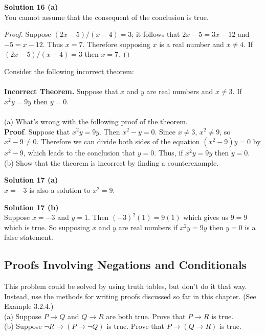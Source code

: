 \textbf{Solution 16 (a)} \\
You cannot assume that the consequent of the conclusion is true.

\begin{proof}
    Suppose $(2x - 5)/(x - 4) = 3$; it follows that $2x - 5 = 3x - 12$ and $-5 = x - 12$. Thus $x = 7$.
    Therefore supposing $x$ is a real number and $x \not = 4$. If 
    $(2x - 5)/(x - 4) = 3$ then $x = 7$.
\end{proof}

\begin{tcolorbox}[title=Problem 17, breakable]
    Consider the following incorrect theorem: \\ \\
    \textbf{Incorrect Theorem.} Suppose that $x$ and $y$ are real numbers 
    and $x \not = 3$. If $x^2y = 9y$ then $y = 0$. \\ \\
    (a) What's wrong with the following proof of the theorem. \\
    \textbf{Proof}. Suppose that $x^2y = 9y$. Then $x^2 - y = 0$. Since
    $x \not = 3$, $x^2 \not = 9$, so $x^2 -9 \not = 0$. Therefore we can divide
    both sides of the equation $(x^2 - 9)y = 0$ by $x^2 - 9$,
    which leads to the conclusion that $y = 0$. Thus, if $x^2y =
        9y$ then $y = 0$. \\
    (b) Show that the theorem is incorrect by finding a counterexample.
\end{tcolorbox}

\textbf{Solution 17 (a)} \\
$x = -3$ is also a solution to $x^2 = 9$.

\textbf{Solution 17 (b)} \\
Suppose $x = -3$ and $y = 1$. Then ${(-3)}^2(1) = 9(1)$ which gives 
us $9 = 9$ which is true. So supposing $x$ and $y$ are real numbers  if $x^2y =
    9y$ then $y = 0$ is a false statement.

\subsection{Proofs Involving Negations and Conditionals}

\begin{tcolorbox}[title=Problem 1, breakable]
    This problem could be solved by using truth tables,
    but don’t do it that way. Instead, use the methods
    for writing proofs discussed so far in this chapter.
    (See Example $3.2.4.$) \\
    (a) Suppose $P \rightarrow Q$ and $Q \rightarrow R$ are both true. Prove that
    $P \rightarrow R$ is true. \\
    (b) Suppose $\neg R \rightarrow (P \rightarrow \neg Q)$ is true. Prove that $P \rightarrow (Q
        \rightarrow R)$ is true.
\end{tcolorbox}

